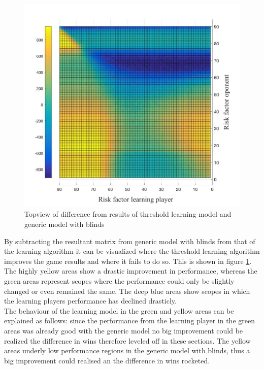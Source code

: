\documentclass[11pt]{article}
\begin{document}
\begin{figure}
\begin{center}
\includegraphics[scale=.3]{Graphics/allDataWins_Threshold_Difference}
\end{center}
\caption{Topview of difference from results of threshold learning model and generic model with blinds}
\label{allDataWins_Threshold_Difference}
\end{figure}

By subtracting the resultant matrix from generic model with blinds from that of the learning algorithm it can be visualized where the threshold learning algorithm improves the game results and where it fails to do so. This is shown in figure \ref{allDataWins_Threshold_Difference}. The highly yellow areas show a drastic improvement in performance, whereas the green areas represent scopes where the performance could only be slightly changed or even remained the same. The deep blue areas show scopes in which the learning players performance has declined drasticly.\\

The behaviour of the learning model in the green and yellow areas can be explained as follows: since the performance from the learning player in the green areas was already good with the generic model no big improvement could be realized the difference in wins therefore leveled off in these sections. The yellow areas underly low performance regions in the generic model with blinds, thus a big improvement could realised an the difference in wins rocketed.\\
\end{document}
